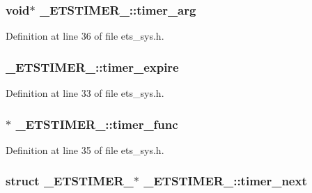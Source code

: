 \subsubsection[{\texorpdfstring{timer\+\_\+arg}{timer_arg}}]{\setlength{\rightskip}{0pt plus 5cm}void$\ast$ \+\_\+\+E\+T\+S\+T\+I\+M\+E\+R\+\_\+\+::timer\+\_\+arg}\hypertarget{struct__ETSTIMER___ac088ddf257850948040acf7399c9715a}{}\label{struct__ETSTIMER___ac088ddf257850948040acf7399c9715a}


Definition at line 36 of file ets\+\_\+sys.\+h.

\subsubsection[{\texorpdfstring{timer\+\_\+expire}{timer_expire}}]{ \+\_\+\+E\+T\+S\+T\+I\+M\+E\+R\+\_\+\+::timer\+\_\+expire}\hypertarget{struct__ETSTIMER___a34542a46b29211ca7f72e4d0bb2dfd60}{}\label{struct__ETSTIMER___a34542a46b29211ca7f72e4d0bb2dfd60}


Definition at line 33 of file ets\+\_\+sys.\+h.

\subsubsection[{\texorpdfstring{timer\+\_\+func}{timer_func}}]{$\ast$ \+\_\+\+E\+T\+S\+T\+I\+M\+E\+R\+\_\+\+::timer\+\_\+func}\hypertarget{struct__ETSTIMER___afaaff07c40e4f2b2c4de07d60981c910}{}\label{struct__ETSTIMER___afaaff07c40e4f2b2c4de07d60981c910}


Definition at line 35 of file ets\+\_\+sys.\+h.

\subsubsection[{\texorpdfstring{timer\+\_\+next}{timer_next}}]{\setlength{\rightskip}{0pt plus 5cm}struct {\bf \+\_\+\+E\+T\+S\+T\+I\+M\+E\+R\+\_\+}$\ast$ \+\_\+\+E\+T\+S\+T\+I\+M\+E\+R\+\_\+\+::timer\+\_\+next}\hypertarget{struct__ETSTIMER___a6835174d54718f900f1dd6fdd5194419}{}\label{struct__ETSTIMER___a6835174d54718f900f1dd6fdd5194419}


